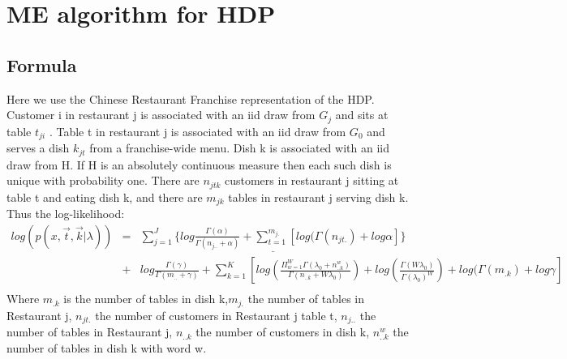 \documentclass{article}
\begin{document}
\section{ME algorithm for HDP}
\subsection{Formula}
Here we use the Chinese Restaurant Franchise representation of the HDP. Customer i in restaurant j is associated with an iid draw from $G_j$ and sits at table $t_{ji}$ . 
Table t in restaurant j is associated with an iid draw from $G_0$ and serves a dish $k_{jt}$ from a franchise-wide menu.
Dish k is associated with an iid draw from H. If H is an absolutely continuous measure then each such dish is unique with probability one.
There are $n_{jtk}$ customers in restaurant j sitting at table t and eating dish k, and there are $m_{jk}$ tables in restaurant j serving dish k.\\
Thus the log-likelihood: 
\begin{eqnarray*}
log(p(x,\vec t,\vec k|\lambda))
&=&\underline{\sum_{j=1}^{J} \{log \frac{\Gamma(\alpha)}{\Gamma(n_{j..}+\alpha)}+\sum_{t=1}^{m_{j.}}[log(\Gamma(n_{jt.})+log \alpha
]\}} \\
&+&log \frac{\Gamma(\gamma)}{\Gamma(m_{..}+\gamma)}+\sum_{k=1}^{K} [log(\frac{\Pi_{w=1}^{W}\Gamma(\lambda_{0}+n_{..k}^{w})}{\Gamma(n_{..k}+W\lambda_{0})})+log(\frac{\Gamma(W\lambda_{0})}{\Gamma(\lambda_{0})^{W}})
+log(\Gamma(m_{.k})+log \gamma]\\ 
\end{eqnarray*}
Where $m_{.k}$ is the number of tables in dish k,$m_{j.}$ the number of tables in Restaurant j,
$n_{jt.}$ the number of customers in Restaurant j table t, $n_{j..}$ the number of tables in Restaurant j,
$n_{..k}$ the number of customers in dish k, $n_{..k}^{w}$ the number of tables in dish k with word w.
\end{document}
